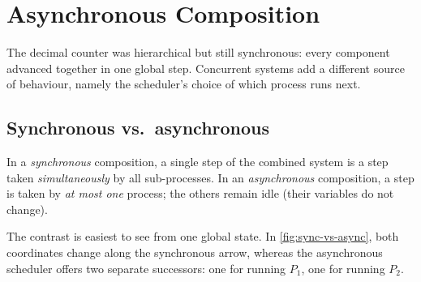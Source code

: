 \section{Asynchronous Composition}
\label{sec:smv-async}

The decimal counter was hierarchical but still synchronous: every component
advanced together in one global step.  Concurrent systems add a different
source of behaviour, namely the scheduler's choice of which process runs
next.

\subsection{Synchronous vs.\ asynchronous}
\label{subsec:sync-async}

In a \emph{synchronous} composition, a single step of the combined system
is a step taken \emph{simultaneously} by all sub-processes.  In an
\emph{asynchronous} composition, a step is taken by \emph{at most one}
process; the others remain idle (their variables do not change).

The contrast is easiest to see from one global state.  In
\cref{fig:sync-vs-async}, both coordinates change along the synchronous
arrow, whereas the asynchronous scheduler offers two separate successors:
one for running $P_1$, one for running $P_2$.

